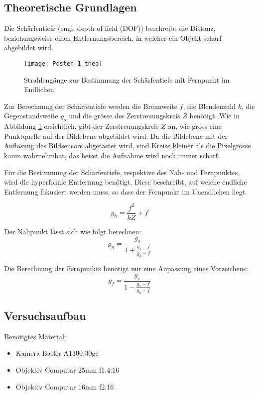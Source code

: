 \subsection{Theoretische Grundlagen}
Die Schärfentiefe (engl. depth of field (DOF)) beschreibt die Distanz,
beziehungsweise einen Entfernungsbereich,
in welcher ein Objekt scharf abgebildet wird.

\begin{figure}[h!]
  \centering
  \texttt{[image: Posten\_1\_theo]}
  \caption{Strahlengänge zur Bestimmung der Schärfentiefe mit Fernpunkt im Endlichen \cite{ref:wiki:schaerfentiefe}}
  \label{fig:p1theo}
\end{figure}

Zur Berechnung der Schärfentiefe werden die Brennweite $f$, die Blendenzahl $k$,
die Gegenstandsweite $g_s$ und die grösse des Zerstreuungskreis $Z$ benötigt.
Wie in Abbildung \ref{fig:p1theo} ersichtlich, gibt der Zerstreuungskreis $Z$ an,
wie gross eine Punktquelle auf der Bildebene abgebildet wird.
Da die Bildebene mit der Auflösung des Bildsensors abgetastet wird,
sind Kreise kleiner als die Pixelgrösse kaum wahrnehmbar,
das heisst die Aufnahme wird noch immer scharf.

Für die Bestimmung der Schärfentiefe, respektive des Nah- und Fernpunktes,
wird die hyperfokale Entfernung benötigt.
Diese beschreibt, auf welche endliche Entfernung fokusiert werden muss,
so dass der Fernpunkt im Unendlichen liegt.

\begin{equation}
  g_h=\frac{f^2}{kZ}+f
\end{equation}

Der Nahpunkt lässt sich wie folgt berechnen: 
\begin{equation}
  g_n=\frac{g_s}{1+\frac{g_s-f}{g_h-f}}
\end{equation}

Die Berechnung der Fernpunkts benötigt nur eine Anpassung eines Vorzeichens:
\begin{equation}
  g_f=\frac{g_s}{1-\frac{g_s-f}{g_h-f}}
\end{equation}

\newpage
\subsection{Versuchsaufbau}
Benötigtes Material:
\begin{itemize}
\item Kamera Basler A1300-30gc
\item Objektiv Computar 25mm f1.4:16
\item Objektiv Computar 16mm f2:16
\end{itemize}

